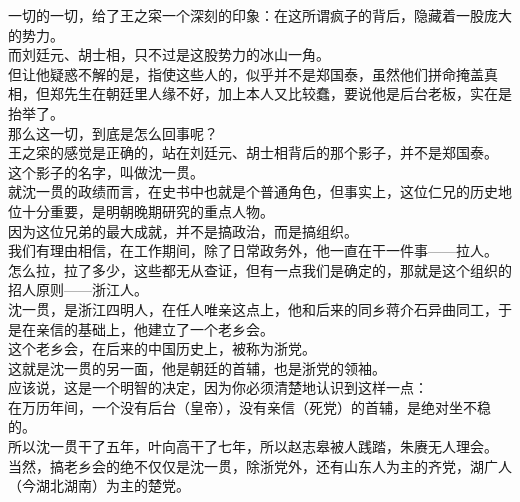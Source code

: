 \begin{multicols}{\theparacolNo}
一切的一切，给了王之寀一个深刻的印象：在这所谓疯子的背后，隐藏着一股庞大的势力。\\

而刘廷元、胡士相，只不过是这股势力的冰山一角。\\

但让他疑惑不解的是，指使这些人的，似乎并不是郑国泰，虽然他们拼命掩盖真相，但郑先生在朝廷里人缘不好，加上本人又比较蠢，要说他是后台老板，实在是抬举了。\\

那么这一切，到底是怎么回事呢？\\

王之寀的感觉是正确的，站在刘廷元、胡士相背后的那个影子，并不是郑国泰。\\

这个影子的名字，叫做沈一贯。\\

就沈一贯的政绩而言，在史书中也就是个普通角色，但事实上，这位仁兄的历史地位十分重要，是明朝晚期研究的重点人物。\\

因为这位兄弟的最大成就，并不是搞政治，而是搞组织。\\

我们有理由相信，在工作期间，除了日常政务外，他一直在干一件事——拉人。\\

怎么拉，拉了多少，这些都无从查证，但有一点我们是确定的，那就是这个组织的招人原则——浙江人。\\

沈一贯，是浙江四明人，在任人唯亲这点上，他和后来的同乡蒋介石异曲同工，于是在亲信的基础上，他建立了一个老乡会。\\

这个老乡会，在后来的中国历史上，被称为浙党。\\

这就是沈一贯的另一面，他是朝廷的首辅，也是浙党的领袖。\\

应该说，这是一个明智的决定，因为你必须清楚地认识到这样一点：\\

在万历年间，一个没有后台（皇帝），没有亲信（死党）的首辅，是绝对坐不稳的。\\

所以沈一贯干了五年，叶向高干了七年，所以赵志皋被人践踏，朱赓无人理会。\\

当然，搞老乡会的绝不仅仅是沈一贯，除浙党外，还有山东人为主的齐党，湖广人（今湖北湖南）为主的楚党。\\


\end{multicols}
